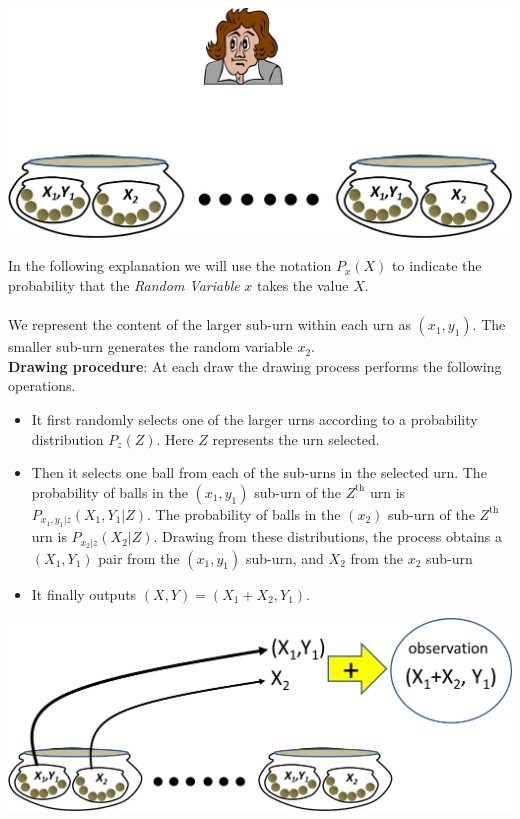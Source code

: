 \begin{center}
\includegraphics[scale=0.4]{figs/process.png}
\end{center}
In the following explanation we will use the notation $P_x(X)$ to indicate the probability that the \textit{Random Variable} $x$ takes the value $X$.
\\
\\
We represent the content of the larger sub-urn within each urn as $(x_1, y_1)$. The smaller sub-urn generates the random variable $x_2$.
\\
\textbf{Drawing procedure}: At each draw the drawing process performs the following operations.
\begin{itemize}
\item It first randomly selects one of the larger urns according to a probability distribution $P_z(Z)$. Here $Z$ represents the urn selected.
\item Then it selects one ball from each of the sub-urns in the selected urn. The probability of balls in the $(x_1,y_1)$ sub-urn of the $Z^{\text{th}}$ urn is $P_{x_1,y_1|z}(X_1,Y_1|Z)$. The probability of balls in the $(x_2)$ sub-urn of the $Z^{\text{th}}$ urn is $P_{x_2|z}(X_2|Z)$. Drawing from these distributions, the process obtains a $(X_1,Y_1)$ pair from the $(x_1, y_1)$ sub-urn, and $X_2$ from the $x_2$ sub-urn
\item It finally outputs  $(X,Y) =  (X_1 + X_2, Y_1)$.
\end{itemize}
\begin{center}
\includegraphics[scale=0.4]{figs/generation.png}
\end{center}

